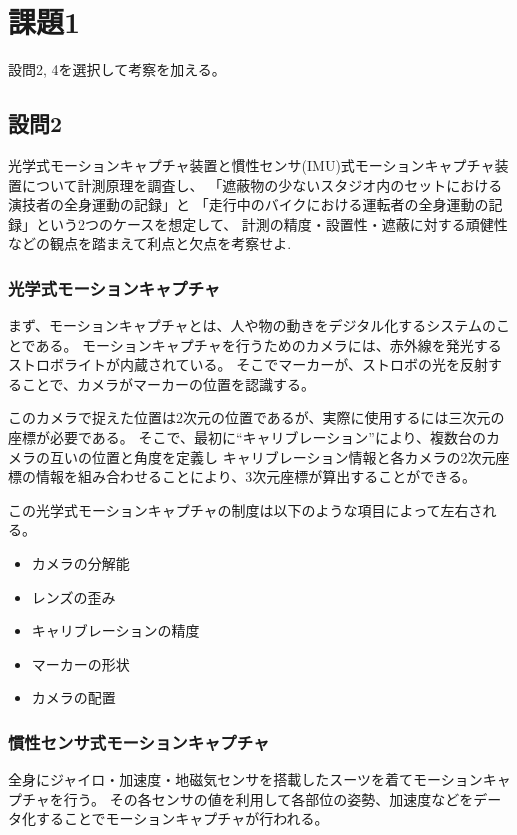\documentclass[11pt,a4j]{jsarticle}
\begin{document}



\section{課題1}
設問2, 4を選択して考察を加える。

\subsection{設問2}
光学式モーションキャプチャ装置と慣性センサ(IMU)式モーションキャプチャ装置について計測原理を調査し、
「遮蔽物の少ないスタジオ内のセットにおける演技者の全身運動の記録」と
「走行中のバイクにおける運転者の全身運動の記録」という2つのケースを想定して、
計測の精度・設置性・遮蔽に対する頑健性などの観点を踏まえて利点と欠点を考察せよ.

\subsubsection{光学式モーションキャプチャ}
まず、モーションキャプチャとは、人や物の動きをデジタル化するシステムのことである。
モーションキャプチャを行うためのカメラには、赤外線を発光するストロボライトが内蔵されている。
そこでマーカーが、ストロボの光を反射することで、カメラがマーカーの位置を認識する。

このカメラで捉えた位置は2次元の位置であるが、実際に使用するには三次元の座標が必要である。
そこで、最初に``キャリブレーション''により、複数台のカメラの互いの位置と角度を定義し
キャリブレーション情報と各カメラの2次元座標の情報を組み合わせることにより、3次元座標が算出することができる。

この光学式モーションキャプチャの制度は以下のような項目によって左右される。

\begin{itemize}
  \item カメラの分解能
  \item レンズの歪み
  \item キャリブレーションの精度
  \item マーカーの形状
  \item カメラの配置
\end{itemize}

\subsubsection{慣性センサ式モーションキャプチャ}
全身にジャイロ・加速度・地磁気センサを搭載したスーツを着てモーションキャプチャを行う。
その各センサの値を利用して各部位の姿勢、加速度などをデータ化することでモーションキャプチャが行われる。
\end{document}
